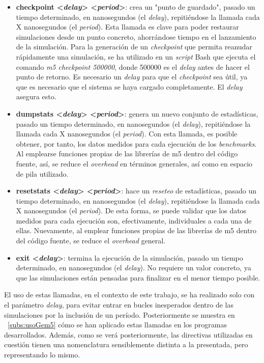 \begin{itemize}
    \item \textbf{checkpoint <\textit{delay}> <\textit{period}>}: crea un "punto de guardado", pasado un tiempo determinado, en nanosegundos (el \textit{delay}), repitiéndose la llamada cada X nanosegundos (el \textit{period}). Esta llamada es clave para poder restaurar simulaciones desde un punto concreto, ahorrándose tiempo en el lanzamiento de la simulación. Para la generación de un \textit{checkpoint} que permita reanudar rápidamente una simulación, se ha utilizado en un \textit{script} Bash que ejecuta el comando \textit{m5 checkpoint 500000}, donde 500000 es el \textit{delay} antes de hacer el punto de retorno. Es necesario un \textit{delay} para que el \textit{checkpoint} sea útil, ya que es necesario que el sistema se haya cargado completamente. El \textit{delay} asegura esto.
    
    \item \textbf{dumpstats <\textit{delay}> <\textit{period}>}: genera un nuevo conjunto de estadísticas, pasado un tiempo determinado, en nanosegundos (el \textit{delay}), repitiéndose la llamada cada X nanosegundos (el \textit{period}). Con esta llamada, es posible obtener, por tanto, los datos medidos para cada ejecución de los \textit{benchmarks}. Al emplearse funciones propias de las librerías de m5 dentro del código fuente, así, se reduce el \textit{overhead} en términos generales, así como en espacio de pila utilizado.
    
    \item \textbf{resetstats <\textit{delay}> <\textit{period}>}: hace un \textit{reseteo} de estadísticas, pasado un tiempo determinado, en nanosegundos (el \textit{delay}), repitiéndose la llamada cada X nanosegundos (el \textit{period}). De esta forma, se puede validar que los datos medidos para cada ejecución son, efectivamente, individuales a cada una de ellas. Nuevamente, al emplear funciones propias de las librerías de m5 dentro del código fuente, se reduce el \textit{overhead} general.

    \item \textbf{exit <\textit{delay}>}: termina la ejecución de la simulación, pasado un tiempo determinado, en nanosegundos (el \textit{delay}). No requiere un valor concreto, ya que las simulaciones están pensadas para finalizar en el menor tiempo posible.
    
\end{itemize}

El uso de estas llamadas, en el contexto de este trabajo, se ha realizado solo con el parámetro \textit{delay}, para evitar entrar en bucles inesperados dentro de las simulaciones por la inclusión de un período. Posteriormente se muestra en ~\ref{subs:usoGem5} cómo se han aplicado estas llamadas en los programas desarrollados. Además, como se verá posteriormente, las directivas utilizadas en cuestión tienen una nomenclatura sensiblemente distinta a la presentada, pero representando lo mismo.


